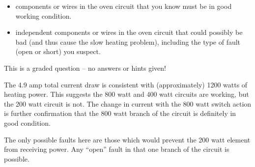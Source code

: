 \vskip 10pt

\begin{itemize}
\item{}  components or wires in the oven circuit that you know must be in good working condition.
\vskip 40pt
\item{}  independent components or wires in the oven circuit that could possibly be bad (and thus cause the slow heating problem), including the type of fault (open or short) you suspect.
\end{itemize}

\vfil 

\eject






This is a graded question -- no answers or hints given!







The 4.9 amp total current draw is consistent with (approximately) 1200 watts of heating power.  This suggests the 800 watt and 400 watt circuits are working, but the 200 watt circuit is not.  The change in current with the 800 watt switch action is further confirmation that the 800 watt branch of the circuit is definitely in good condition.

\vskip 10pt

The only possible faults here are those which would prevent the 200 watt element from receiving power.  Any ``open'' fault in that one branch of the circuit is possible.





